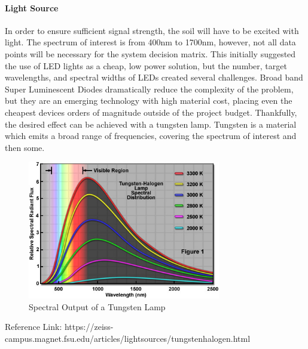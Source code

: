 \paragraph{Light Source} In order to ensure sufficient signal strength, the soil will have to be excited with light. The spectrum of interest is from 400nm to 1700nm, however, not all data points will be necessary for the system decision matrix. This initially suggested the use of LED lights as a cheap, low power solution, but the number, target wavelengths, and spectral widths of LEDs created several challenges. Broad band Super Luminescent Diodes dramatically reduce the complexity of the problem, but they are an emerging technology with high material cost, placing even the cheapest devices orders of magnitude outside of the project budget. Thankfully, the desired effect can be achieved with a tungsten lamp. Tungsten is a material which emits a broad range of frequencies, covering the spectrum of interest and then some.

\begin{figure}[H]
    \caption{Spectral Output of a Tungsten Lamp}
    \centering
    \includegraphics[width=0.75\textwidth]{images/TungstenLamp.jpg}
\end{figure}
Reference Link: https://zeiss-campus.magnet.fsu.edu/articles/lightsources/tungstenhalogen.html

